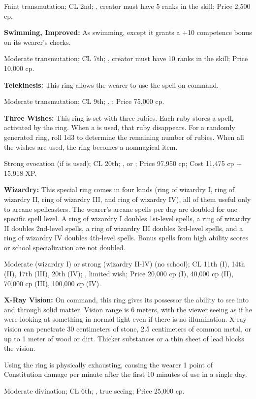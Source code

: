 Faint transmutation; CL 2nd; , creator must have 5 ranks in the  skill; Price 2,500 cp.

\textbf{Swimming, Improved:} As swimming, except it grants a +10 competence bonus on its wearer's  checks.

Moderate transmutation; CL 7th; , creator must have 10 ranks in the  skill; Price 10,000 cp.

\textbf{Telekinesis:} This ring allows the wearer to use the spell  on command.

Moderate transmutation; CL 9th; , ; Price 75,000 cp.

\textbf{Three Wishes:} This ring is set with three rubies. Each ruby stores a  spell, activated by the ring. When a  is used, that ruby disappears. For a randomly generated ring, roll 1d3 to determine the remaining number of rubies. When all the wishes are used, the ring becomes a nonmagical item.

Strong evocation (if  is used); CL 20th; ,  or ; Price 97,950 cp; Cost 11,475 cp + 15,918 XP.



\textbf{Wizardry:} This special ring comes in four kinds (ring of wizardry I, ring of wizardry II, ring of wizardry III, and ring of wizardry IV), all of them useful only to arcane spellcasters. The wearer's arcane spells per day are doubled for one specific spell level. A ring of wizardry I doubles 1st-level spells, a ring of wizardry II doubles 2nd-level spells, a ring of wizardry III doubles 3rd-level spells, and a ring of wizardry IV doubles 4th-level spells. Bonus spells from high ability scores or school specialization are not doubled.

Moderate (wizardry I) or strong (wizardry II-IV) (no school); CL 11th (I), 14th (II), 17th (III), 20th (IV); , limited wish; Price 20,000 cp (I), 40,000 cp (II), 70,000 cp (III), 100,000 cp (IV).

\textbf{X-Ray Vision:} On command, this ring gives its possessor the ability to see into and through solid matter. Vision range is 6 meters, with the viewer seeing as if he were looking at something in normal light even if there is no illumination. X-ray vision can penetrate 30 centimeters of stone, 2.5 centimeters of common metal, or up to 1 meter of wood or dirt. Thicker substances or a thin sheet of lead blocks the vision.

Using the ring is physically exhausting, causing the wearer 1 point of Constitution damage per minute after the first 10 minutes of use in a single day.

Moderate divination; CL 6th; , true seeing; Price 25,000 cp.


